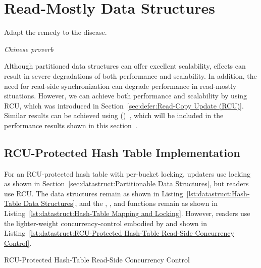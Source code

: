 \section{Read-Mostly Data Structures}
\label{sec:datastruct:Read-Mostly Data Structures}
%
\epigraph{Adapt the remedy to the disease.}{\emph{Chinese proverb}}

Although partitioned data structures can offer excellent scalability,
 effects can result in severe degradations of both performance and
scalability.
In addition,
the need for read-side synchronization can degrade performance in
read-mostly situations.
However, we can achieve both performance and scalability by using
RCU, which was introduced in
Section~\ref{sec:defer:Read-Copy Update (RCU)}.
Similar results can be achieved using 
()~\cite{MagedMichael04a}, which will be included in
the performance results shown in this
section~\cite{McKenney:2013:SDS:2483852.2483867}.

\subsection{RCU-Protected Hash Table Implementation}
\label{sec:datastruct:RCU-Protected Hash Table Implementation}

For an RCU-protected hash table with per-bucket locking,
updaters use locking as shown in
Section~\ref{sec:datastruct:Partitionable Data Structures},
but readers use RCU\@.
The data structures remain as shown in
Listing~\ref{lst:datastruct:Hash-Table Data Structures},
and the , , and 
functions remain as shown in
Listing~\ref{lst:datastruct:Hash-Table Mapping and Locking}.
However, readers use the lighter-weight concurrency-control embodied
by  and 
shown in
Listing~\ref{lst:datastruct:RCU-Protected Hash-Table Read-Side Concurrency Control}.

\begin{listing}

\caption{RCU-Protected Hash-Table Read-Side Concurrency Control}
\label{lst:datastruct:RCU-Protected Hash-Table Read-Side Concurrency Control}
\end{listing}

